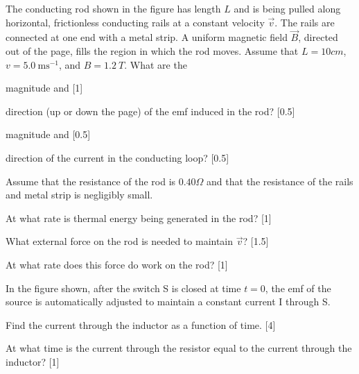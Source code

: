 \begin{problem}
    The conducting rod shown in the figure has length $L$ and is being pulled along horizontal, frictionless conducting rails at a constant velocity $\vec{v}$. The rails are connected at one end with a metal strip. A uniform magnetic field $\vec{B}$, directed out of the page, fills the region in which the rod moves. Assume that $L = 10 \unit{cm}$, $v = \qty{5.0}{\m\s^{-1}}$, and $B = \qty{1.2}{T}$. What are the
    \begin{subproblemalph}
        \item magnitude and \hfill [1]
        \item direction (up or down the page) of the emf induced in the rod? \hfill [0.5]
        \item magnitude and \hfill [0.5]
        \item direction of the current in the conducting loop? \hfill [0.5]
    \end{subproblemalph}
    Assume that the resistance of the rod is $0.40 \Omega$ and that the resistance of the rails and metal strip is negligibly small.
    \begin{subproblemalph}
        \setcounter{enumi}{4}
        \item At what rate is thermal energy being generated in the rod? \hfill [1]
        \item What external force on the rod is needed to maintain $\vec{v}$? \hfill [1.5]
        \item At what rate does this force do work on the rod? \hfill [1]
    \end{subproblemalph}
\end{problem}

\begin{problem}
    In the figure shown, after the switch S is closed at time $t = 0$, the emf of the source is automatically adjusted to maintain a constant current I through S.
    \begin{subproblemalph}
        \item Find the current through the inductor as
a function of time. \hfill [4]
        \item At what time is the current through the
resistor equal to the current through the
inductor? \hfill [1]
    \end{subproblemalph} 
\end{problem}